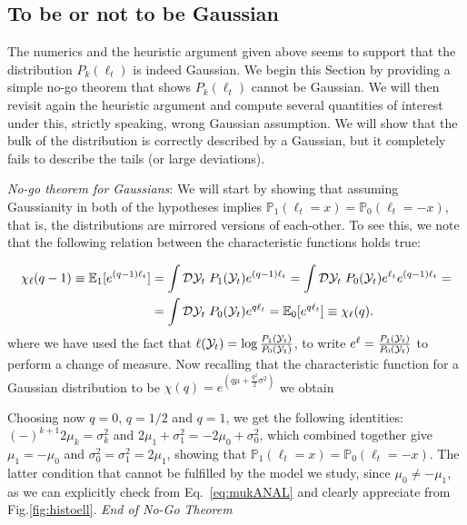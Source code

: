 \subsection{To be or not to be Gaussian}\label{ssec:cmon_gaussian_model}
The numerics and the heuristic argument given above seems to support that the distribution $P_k(\ell_{t})$ is indeed Gaussian. We begin this Section by providing a simple no-go theorem that shows $P_k(\ell_{t})$ cannot be Gaussian. We will then revisit again the heuristic argument and compute several quantities of interest under this, strictly speaking, wrong Gaussian assumption. We will show that the bulk of the distribution is correctly described by a Gaussian, but it completely fails to describe the tails (or large deviations).

\emph{No-go theorem for Gaussians}:
We will start by showing that assuming Gaussianity in both of the hypotheses implies $\mathbb{P}_{1}(\ell_{t}=x) = \mathbb{P}_{0}(\ell_{t}=-x)$, that is, the distributions are mirrored versions of each-other. To see this, we note that the following relation between the characteristic functions holds true:

\begin{align}
\chi_\ell(q-1)\equiv\mathbb{E}_{1}[e^{(q-1)\ell_{t}}] &= \int \mathcal{D}\mathcal{Y}_t \; P_{1}(\mathcal{Y}_t)  e^{(q-1)\ell_{t}}
=\int \mathcal{D}\mathcal{Y}_t  \; P_{0}(\mathcal{Y}_t) e^{\ell_{t}} e^{(q-1)\ell_{t}}=\nonumber\\
&=\int  \mathcal{D}\mathcal{Y}_t \; P_{0}(\mathcal{Y}_t)   e^{q\ell_{t}}=
\mathbb{E}_{0}[e^{q\ell_{t}}]\equiv \chi_\ell(q).
\end{align}
where we have used the fact that  $\ell(\mathcal{Y}_t) = \log{\frac{P_1(\mathcal{Y}_t)}{P_0(\mathcal{Y}_t)}}$, to write
$e^{\ell}=\frac{P_1(\mathcal{Y}_t)}{P_0(\mathcal{Y}_t)}$  to perform a change of measure.
Now recalling that the characteristic function for a Gaussian distribution to be $\chi(q)= e^{(q\mu +\frac{q^2}{2}{\sigma^{2}})}$ we obtain 

Choosing now $q=0$, $q=1/2$ and $q=1$, we get the following identities: $(-)^{k+1}2\mu_{k}=\sigma_{k}^{2}$ and $2\mu_{1}+\sigma_{1}^{2}=-2\mu_{0}+\sigma_{0}^{2}$, which combined together give $\mu_{1}=-\mu_{0}$ and $\sigma_{0}^{2}=\sigma_{1}^{2}=2\mu_{1}$,
showing that $\mathbb{P}_{1}(\ell_{t}=x) = \mathbb{P}_{0}(\ell_{t}=-x)$. The latter condition that cannot be fulfilled by the model we study, since $\mu_0\neq -\mu_1$, as we can explicitly check from Eq.~\ref{eq:mukANAL} and clearly appreciate from Fig.\ref{fig:histoell}.
\emph{End of No-Go Theorem}

